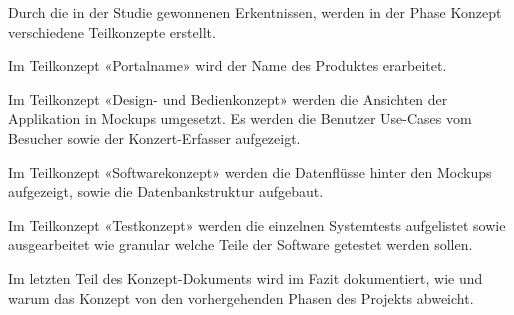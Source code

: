 Durch die in der Studie gewonnenen Erkentnissen, werden in der Phase Konzept
verschiedene Teilkonzepte erstellt.

Im Teilkonzept «Portalname» wird der Name des Produktes erarbeitet.

Im Teilkonzept «Design- und Bedienkonzept» werden die Ansichten der Applikation
in Mockups umgesetzt. Es werden die Benutzer Use-Cases vom Besucher sowie der
Konzert-Erfasser aufgezeigt.

Im Teilkonzept «Softwarekonzept» werden die Datenflüsse hinter den Mockups
aufgezeigt, sowie die Datenbankstruktur aufgebaut.

Im Teilkonzept «Testkonzept» werden die einzelnen Systemtests aufgelistet sowie
ausgearbeitet wie granular welche Teile der Software getestet werden sollen.

Im letzten Teil des Konzept-Dokuments wird im Fazit dokumentiert, wie und warum
das Konzept von den vorhergehenden Phasen des Projekts abweicht.
